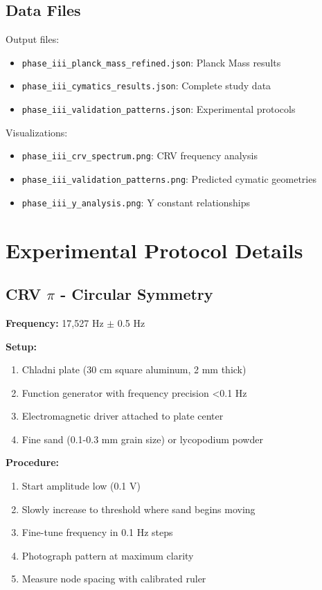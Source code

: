 \documentclass[11pt,a4paper]{article}
\begin{document}
\subsection{Data Files}

Output files:
\begin{itemize}
    \item \texttt{phase\_iii\_planck\_mass\_refined.json}: Planck Mass results
    \item \texttt{phase\_iii\_cymatics\_results.json}: Complete study data
    \item \texttt{phase\_iii\_validation\_patterns.json}: Experimental protocols
\end{itemize}

Visualizations:
\begin{itemize}
    \item \texttt{phase\_iii\_crv\_spectrum.png}: CRV frequency analysis
    \item \texttt{phase\_iii\_validation\_patterns.png}: Predicted cymatic geometries
    \item \texttt{phase\_iii\_y\_analysis.png}: Y constant relationships
\end{itemize}

\section{Experimental Protocol Details}

\subsection{CRV $\pi$ - Circular Symmetry}

\textbf{Frequency:} 17,527 Hz $\pm$ 0.5 Hz

\textbf{Setup:}
\begin{enumerate}
    \item Chladni plate (30 cm square aluminum, 2 mm thick)
    \item Function generator with frequency precision <0.1 Hz
    \item Electromagnetic driver attached to plate center
    \item Fine sand (0.1-0.3 mm grain size) or lycopodium powder
\end{enumerate}

\textbf{Procedure:}
\begin{enumerate}
    \item Start amplitude low (0.1 V)
    \item Slowly increase to threshold where sand begins moving
    \item Fine-tune frequency in 0.1 Hz steps
    \item Photograph pattern at maximum clarity
    \item Measure node spacing with calibrated ruler
\end{enumerate}
\end{document}
